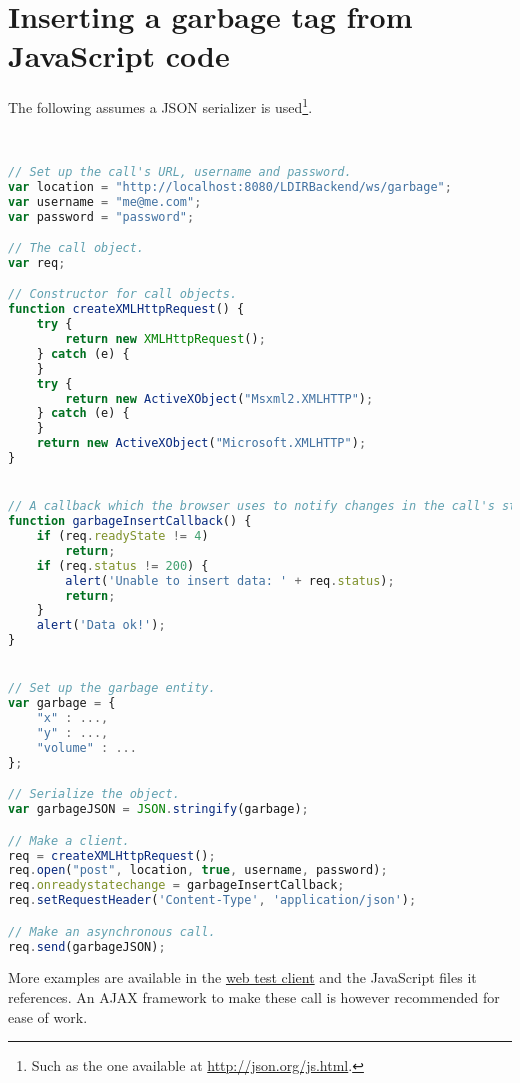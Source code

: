 \section{Inserting a garbage tag from JavaScript code}

The following assumes a JSON serializer is used\footnote{Such as the one
available at \url{http://json.org/js.html}.}.
\begin{lstlisting}[language=JavaScript]


// Set up the call's URL, username and password.
var location = "http://localhost:8080/LDIRBackend/ws/garbage";
var username = "me@me.com";
var password = "password";

// The call object.
var req;

// Constructor for call objects.
function createXMLHttpRequest() {
    try {
        return new XMLHttpRequest();
    } catch (e) {
    }
    try {
        return new ActiveXObject("Msxml2.XMLHTTP");
    } catch (e) {
    }
    return new ActiveXObject("Microsoft.XMLHTTP");
}


// A callback which the browser uses to notify changes in the call's state.
function garbageInsertCallback() {
    if (req.readyState != 4)
        return;
    if (req.status != 200) {
        alert('Unable to insert data: ' + req.status);
        return;
    }
    alert('Data ok!');
}


// Set up the garbage entity.
var garbage = {
    "x" : ...,
    "y" : ...,
    "volume" : ...
};

// Serialize the object.
var garbageJSON = JSON.stringify(garbage);

// Make a client.
req = createXMLHttpRequest();
req.open("post", location, true, username, password);
req.onreadystatechange = garbageInsertCallback;
req.setRequestHeader('Content-Type', 'application/json');

// Make an asynchronous call.
req.send(garbageJSON);
\end{lstlisting}

More examples are available in the
\href{http://code.google.com/p/letsdoitromania2011/source/browse/trunk/Web/Service/LDIRBackendWeb/WebContent/index.html}{web
test client} and the JavaScript files it references.  An AJAX framework to make
these call is however recommended for ease of work.
